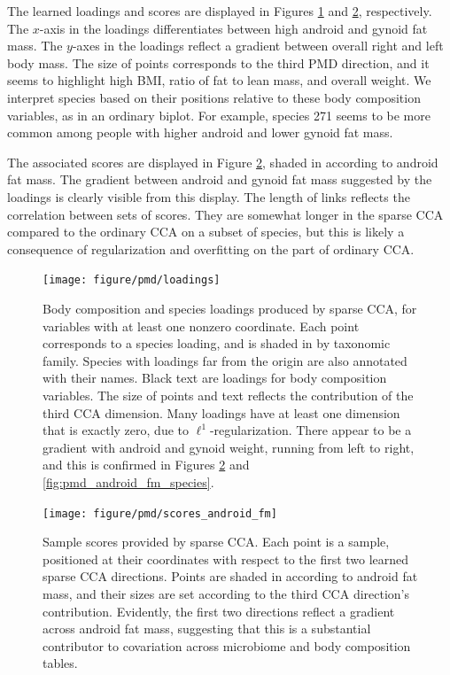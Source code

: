 \documentclass[14pt]{extarticle}
\begin{document}
The learned loadings and scores are displayed in Figures \ref{fig:pmd_loadings}
and \ref{fig:pmd_scores_android_fm}, respectively. The $x$-axis in the loadings
differentiates between high android and gynoid fat mass. The $y$-axes in the
loadings reflect a gradient between overall right and left body mass. The size
of points corresponds to the third PMD direction, and it seems to highlight high
BMI, ratio of fat to lean mass, and overall weight. We interpret species
based on their positions relative to these body composition variables, as in an
ordinary biplot. For example, species 271 seems to be more common among people
with higher android and lower gynoid fat mass.

The associated scores are displayed in Figure \ref{fig:pmd_scores_android_fm},
shaded in according to android fat mass. The gradient between android and gynoid
fat mass suggested by the loadings is clearly visible from this display. The
length of links reflects the correlation between sets of scores. They are
somewhat longer in the sparse CCA compared to the ordinary CCA on a subset of
species, but this is likely a consequence of regularization and overfitting on
the part of ordinary CCA.

\begin{figure}
  \centering
  \texttt{[image: figure/pmd/loadings]}
  \caption{
    Body composition and species loadings produced by sparse CCA, for variables
    with at least one nonzero coordinate. Each point corresponds to a species
    loading, and is shaded in by taxonomic family. Species with loadings far
    from the origin are also annotated with their names. Black text are loadings
    for body composition variables. The size of points and text reflects the
    contribution of the third CCA dimension. Many loadings have at least one
    dimension that is exactly zero, due to $\ell^{1}$-regularization. There
    appear to be a gradient with android and gynoid weight, running from left to
    right, and this is confirmed in Figures \ref{fig:pmd_scores_android_fm} and
    \ref{fig:pmd_android_fm_species}.
    \label{fig:pmd_loadings}
  }
\end{figure}

\begin{figure}
  \centering
  \texttt{[image: figure/pmd/scores\_android\_fm]}
  \caption{
    Sample scores provided by sparse CCA. Each point is a sample, positioned at
    their coordinates with respect to the first two learned sparse CCA
    directions. Points are shaded in according to android fat mass, and their
    sizes are set according to the third CCA direction's contribution.
    Evidently, the first two directions reflect a gradient across android fat
    mass, suggesting that this is a substantial contributor to covariation
    across microbiome and body composition tables.
    \label{fig:pmd_scores_android_fm}
  }
\end{figure}
\end{document}
